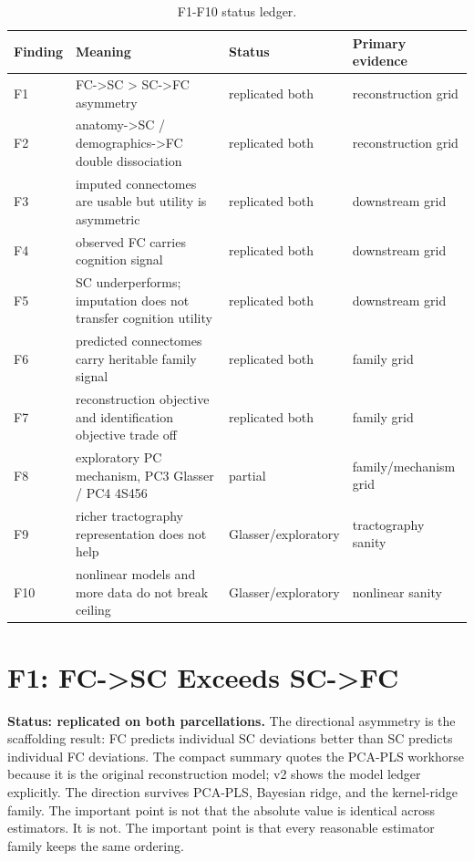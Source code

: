 \documentclass{article}
\begin{document}
\begin{table}[H]
\centering
\scriptsize
\caption{F1-F10 status ledger.}
\label{tab:status}
\begin{tabular}{llll}
\toprule
Finding & Meaning & Status & Primary evidence \\
\midrule
F1 & FC->SC > SC->FC asymmetry & replicated both & reconstruction grid \\
F2 & anatomy->SC / demographics->FC double dissociation & replicated both & reconstruction grid \\
F3 & imputed connectomes are usable but utility is asymmetric & replicated both & downstream grid \\
F4 & observed FC carries cognition signal & replicated both & downstream grid \\
F5 & SC underperforms; imputation does not transfer cognition utility & replicated both & downstream grid \\
F6 & predicted connectomes carry heritable family signal & replicated both & family grid \\
F7 & reconstruction objective and identification objective trade off & replicated both & family grid \\
F8 & exploratory PC mechanism, PC3 Glasser / PC4 4S456 & partial & family/mechanism grid \\
F9 & richer tractography representation does not help & Glasser/exploratory & tractography sanity \\
F10 & nonlinear models and more data do not break ceiling & Glasser/exploratory & nonlinear sanity \\
\bottomrule
\end{tabular}
\end{table}

\section{F1: FC->SC Exceeds SC->FC}

\textbf{Status: replicated on both parcellations.} The directional asymmetry is the
scaffolding result: FC predicts individual SC deviations better than SC predicts
individual FC deviations. The compact summary quotes the PCA-PLS workhorse because it is
the original reconstruction model; v2 shows the model ledger explicitly. The direction
survives PCA-PLS, Bayesian ridge, and the kernel-ridge family. The important point is not
that the absolute value is identical across estimators. It is not. The important point is
that every reasonable estimator family keeps the same ordering.
\end{document}
